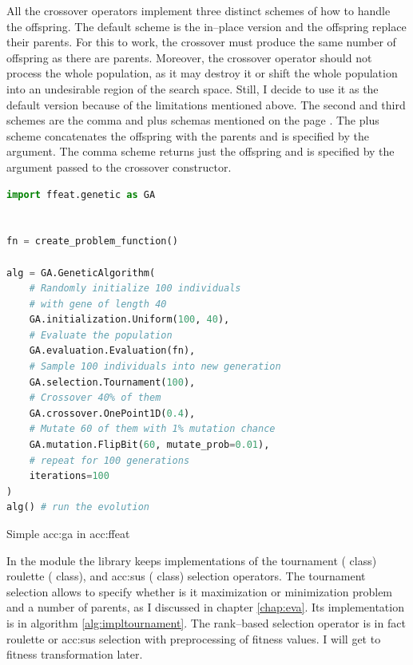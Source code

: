 All the crossover operators implement three distinct schemes of how to handle the offspring. The default scheme is the in--place version and the offspring replace their parents. For this to work, the crossover must produce the same number of offspring as there are parents. Moreover, the crossover operator should not process the whole population, as it may destroy it or shift the whole population into an undesirable region of the search space. Still, I decide to use it as the default version because of the \gpu limitations mentioned above.
The second and third schemes are the comma and plus schemas mentioned on the page \pageref{enum:steadystate}. The plus scheme concatenates the offspring with the parents and is specified by the  argument. The comma scheme returns just the offspring and is specified by the  argument passed to the crossover constructor.

\begin{algorithm}[b!]
\begin{lstlisting}[language=Python, xrightmargin=18pt]
import ffeat.genetic as GA


fn = create_problem_function()

alg = GA.GeneticAlgorithm(
    # Randomly initialize 100 individuals 
    # with gene of length 40
    GA.initialization.Uniform(100, 40),
    # Evaluate the population
    GA.evaluation.Evaluation(fn),
    # Sample 100 individuals into new generation
    GA.selection.Tournament(100),
    # Crossover 40% of them
    GA.crossover.OnePoint1D(0.4),
    # Mutate 60 of them with 1% mutation chance
    GA.mutation.FlipBit(60, mutate_prob=0.01),
    # repeat for 100 generations
    iterations=100
)
alg() # run the evolution
\end{lstlisting}
\caption{Simple \acrshort*{acc:ga} in \acrshort*{acc:ffeat}}
\label{alg:gaffeat}
\end{algorithm}

In the  module the library keeps implementations of the 
tournament ( class)
roulette ( class), 
and \acrlong{acc:sus} ( class)
selection operators. The tournament selection allows to specify whether is it maximization or minimization problem and a number of parents, as I discussed in chapter \ref{chap:eva}. Its implementation is in algorithm \ref{alg:impltournament}. The rank--based selection operator is in fact roulette or \acrshort{acc:sus} selection with preprocessing of fitness values. I will get to fitness transformation later.


